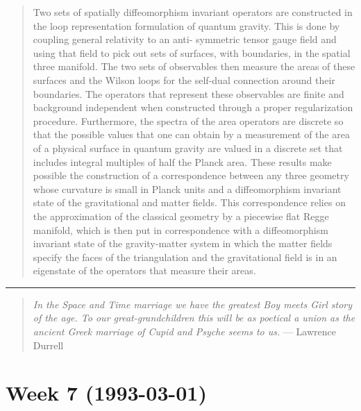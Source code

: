 \documentclass{article}
\def\tightlist{}
\renewcommand{\texttt}[1]{%
  \begingroup
  \ttfamily
  \begingroup\lccode`~=`/\lowercase{\endgroup\def~}{/\discretionary{}{}{}}%
  \begingroup\lccode`~=`[\lowercase{\endgroup\def~}{[\discretionary{}{}{}}%
  \begingroup\lccode`~=`.\lowercase{\endgroup\def~}{.\discretionary{}{}{}}%
  \catcode`/=\active\catcode`[=\active\catcode`.=\active
  \scantokens{#1\noexpand}%
  \endgroup
}
\begin{document}
\begin{quote}
Two sets of spatially diffeomorphism invariant operators are constructed
in the loop representation formulation of quantum gravity. This is done
by coupling general relativity to an anti- symmetric tensor gauge field
and using that field to pick out sets of surfaces, with boundaries, in
the spatial three manifold. The two sets of observables then measure the
areas of these surfaces and the Wilson loops for the self-dual
connection around their boundaries. The operators that represent these
observables are finite and background independent when constructed
through a proper regularization procedure. Furthermore, the spectra of
the area operators are discrete so that the possible values that one can
obtain by a measurement of the area of a physical surface in quantum
gravity are valued in a discrete set that includes integral multiples of
half the Planck area. These results make possible the construction of a
correspondence between any three geometry whose curvature is small in
Planck units and a diffeomorphism invariant state of the gravitational
and matter fields. This correspondence relies on the approximation of
the classical geometry by a piecewise flat Regge manifold, which is then
put in correspondence with a diffeomorphism invariant state of the
gravity-matter system in which the matter fields specify the faces of
the triangulation and the gravitational field is in an eigenstate of the
operators that measure their areas.
\end{quote}

\begin{center}\rule{0.5\linewidth}{0.5pt}\end{center}

\begin{quote}
\emph{In the Space and Time marriage we have the greatest Boy meets Girl
story of the age. To our great-grandchildren this will be as poetical a
union as the ancient Greek marriage of Cupid and Psyche seems to us.}
--- Lawrence Durrell
\end{quote}
\hypertarget{week7}{%
\section{Week 7 (1993-03-01)}\label{week7}}

\end{document}
